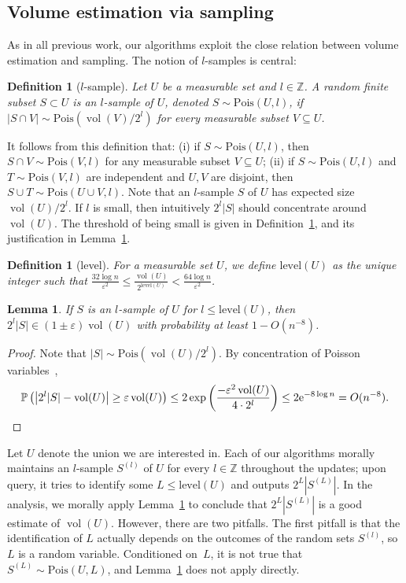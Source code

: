 \documentclass[11pt]{article}
\def\Integer{\mathbb{Z}}
\let\Z\Integer
\def\vol{\operatorname{vol}}		%
\newtheorem{lemma}[theorem]{Lemma}
\newtheorem{definition}[theorem]{Definition}
\newcommand{\Pois}{\mathrm{Pois}}
\newcommand{\level}{\mathrm{level}}
\newcommand{\eps}{\varepsilon}
\renewcommand{\Pr}{\mathbb{P}}
\def\aftermath{\par\vspace{-\belowdisplayskip}\vspace{-\baselineskip}}
\begin{document}
\subsection{Volume estimation via sampling}
As in all previous work, our algorithms exploit the close relation between volume estimation and sampling. The notion of $l$-samples is central:
%
\begin{definition}[$l$-sample]
    Let $U$ be a measurable set and $l \in \Z$. A random finite subset $S \subset U$ is an \emph{$l$-sample} of $U$, denoted $S \sim \Pois(U,l)$, if $|S \cap V| \sim \Pois(\vol(V)/2^l)$ for every measurable subset $V \subseteq U$.
\end{definition}
%
It follows from this definition that: (i) if $S \sim \Pois(U,l)$, then $S \cap V \sim \Pois(V,l)$ for any measurable subset $V \subseteq U$; (ii) if $S \sim \Pois(U,l)$ and $T \sim \Pois(V,l)$ are independent and $U,V$ are disjoint, then $S \cup T \sim \Pois(U \cup V, l)$.
%
Note that an $l$-sample $S$ of $U$ has expected size $\vol(U)/2^l$.
If $l$ is small, then intuitively $2^l |S|$ should concentrate around $\vol(U)$. The threshold of being small is given in Definition~\ref{def:level}, and its justification in Lemma~\ref{lem:l-sample}.
\begin{definition}[level]
    \label{def:level}
    For a measurable set $U$, we define $\level(U)$ as the unique integer such that $\frac{32 \log n}{\eps^2} \leq \frac{\vol(U)}{2^{\level(U)}} < \frac{64 \log n}{\eps^2}$.
\end{definition}
%
\begin{lemma}
    \label{lem:l-sample}
    If $S$ is an $l$-sample of $U$ for $l \leq \level(U)$, then $2^l |S| \in (1\pm\eps) \vol(U)$ with probability at least $1 - O(n^{-8})$.
\end{lemma}
%
\begin{proof}
    Note that $|S| \sim \Pois(\vol(U)/2^l)$. By concentration of Poisson variables~\cite{Canonne19},
    \[
        \Pr \left( \left| 2^l |S| - \vol(U) \right| \geq \eps \vol(U) \right)
        \leq 2\exp\left( \frac{-\eps^2 \vol(U)}{4 \cdot 2^l} \right)
        \leq 2\mathrm{e}^{-8 \log n} = O(n^{-8}).\qedhere
    \]
    \aftermath
\end{proof}
%
Let $U$ denote the union we are interested in. Each of our algorithms morally maintains an $l$-sample $S^{(l)}$ of $U$ for every $l \in \Z$ throughout the updates; upon query, it tries to identify some $L \leq \level(U)$ and outputs $2^L |S^{(L)}|$. In the analysis, we morally apply Lemma~\ref{lem:l-sample} to conclude that $2^L |S^{(L)}|$ is a good estimate of $\vol(U)$. However, there are two pitfalls. The first pitfall is that the identification of $L$ actually depends on the outcomes of the random sets $S^{(l)}$, so $L$ is a random variable. Conditioned on~$L$, it is not true that $S^{(L)} \sim \Pois(U, L)$, and Lemma~\ref{lem:l-sample} does not apply directly.
\end{document}

